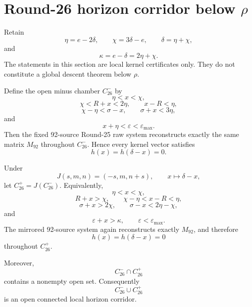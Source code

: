 \section{Round-26 horizon corridor below \texorpdfstring{$\rho$}{rho}}
\label{sec:p12-round26-horizon-corridor}

Retain
\[
\eta=e-2\delta,\qquad
\chi=3\delta-e,\qquad
\delta=\eta+\chi,
\]
and
\[
\kappa=e-\delta=2\eta+\chi.
\]
The statements in this section are local kernel certificates only. They do not
constitute a global descent theorem below \(\rho\).

\begin{proposition}
\label{prop:p12-r26-horizon-corridor}
Define the open minus chamber \(C_{26}^{-}\) by
\[
\eta<x<\chi,
\]
\[
\chi<R+x<2\eta,
\qquad
x-R<\eta,
\]
\[
\chi-\eta<\sigma-x,
\qquad
\sigma+x<3\eta,
\]
and
\[
x+\eta<\varepsilon<\varepsilon_{\max}.
\]
Then the fixed 92-source Round-25 raw system reconstructs exactly the same
matrix \(M_{92}\) throughout \(C_{26}^{-}\). Hence every kernel vector
satisfies
\[
\boxed{h(x)=h(\delta-x)=0}.
\]

Under
\[
J(s,m,n)=(-s,m,n+s),
\qquad x\mapsto\delta-x,
\]
let \(C_{26}^{+}=J(C_{26}^{-})\). Equivalently,
\[
\eta<x<\chi,
\]
\[
R+x>\chi,
\qquad
\chi-\eta<x-R<\eta,
\]
\[
\sigma+x>2\chi,
\qquad
\sigma-x<2\eta-\chi,
\]
and
\[
\varepsilon+x>\kappa,
\qquad
\varepsilon<\varepsilon_{\max}.
\]
The mirrored 92-source system again reconstructs exactly \(M_{92}\), and
therefore
\[
\boxed{h(x)=h(\delta-x)=0}
\]
throughout \(C_{26}^{+}\).

Moreover,
\[
C_{26}^{-}\cap C_{26}^{+}
\]
contains a nonempty open set. Consequently
\[
\boxed{C_{26}^{-}\cup C_{26}^{+}}
\]
is an open connected local horizon corridor.
\end{proposition}

